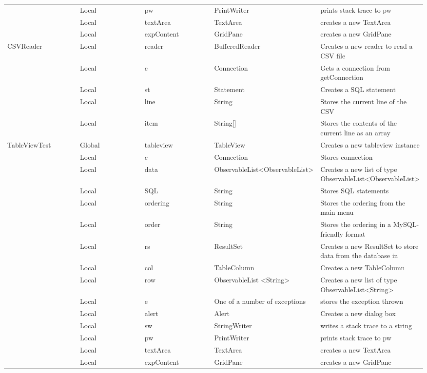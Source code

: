 \documentclass[11pt]{report}
\begin{document}
\begin{longtable}{|p{0.2\linewidth}|p{0.2\linewidth}|p{0.2\linewidth}|p{0.2\linewidth}|p{0.2\linewidth}|}
			 & Local & pw & PrintWriter & prints stack trace to pw \\
			 & Local & textArea & TextArea & creates a new TextArea \\
			 & Local & expContent & GridPane & creates a new GridPane\\
			 \hline
			CSVReader & Local & reader & BufferedReader & Creates a new reader to read a CSV file \\
			 & Local & c & Connection & Gets a connection from getConnection\\
			 & Local & st & Statement & Creates a SQL statement \\
			 & Local & line & String & Stores the current line of the CSV\\
			 & Local & item & String[] & Stores the contents of the current line as an array\\
			 \hline
			TableViewTest & Global & tableview & TableView & Creates a new tableview instance\\
			 & Local & c & Connection & Stores connection\\
			 & Local & data & ObservableList<ObservableList> & Creates a new list of type ObservableList<ObservableList> \\
			 & Local & SQL & String & Stores SQL statements \\
			 & Local & ordering & String & Stores the ordering from the main menu \\
			 & Local & order & String & Stores the ordering in a MySQL-friendly format \\
			 & Local & rs & ResultSet & Creates a new ResultSet to store data from the database in \\
			 & Local & col & TableColumn & Creates a new TableColumn \\
			 & Local & row  & ObservableList <String> & Creates a new list of type ObservableList<String> \\
			 & Local & e & One of a number of exceptions & stores the exception thrown \\
			 & Local & alert & Alert & Creates a new dialog box\\
			 & Local & sw & StringWriter & writes a stack trace to a string \\
			 & Local & pw & PrintWriter & prints stack trace to pw \\
			 & Local & textArea & TextArea & creates a new TextArea \\
			 & Local & expContent & GridPane & creates a new GridPane\\

\end{longtable}
\end{document}
